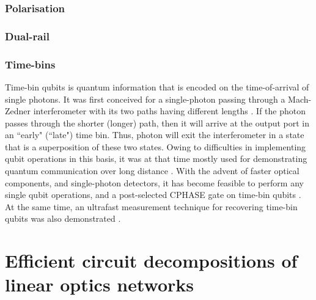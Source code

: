 \documentclass[aps,rmp,twocolumn,amsmath,amssymb,nofootinbib,superscriptaddress]{revtex4}
\begin{document}
\subsubsection{Polarisation}

\subsubsection{Dual-rail}

\subsubsection{Time-bins}
Time-bin qubits is quantum information that is encoded on the time-of-arrival of single photons. It was first conceived for a single-photon passing through a Mach-Zedner interferometer with its two paths having different lengths \cite{bib:Brendel99}. If the photon passes through the shorter (longer) path, then it will arrive at the output port in an ``early" (``late") time bin. Thus, photon will exit the interferometer in a state that is a superposition of these two states. Owing to difficulties in implementing qubit operations in this basis, it was at that time mostly used for demonstrating quantum communication over long distance \cite{bib:Thew02,bib:Marcikic04}. With the advent of faster optical components, and single-photon detectors, it has become feasible to perform any single qubit operations, and a post-selected CPHASE gate on time-bin qubits \cite{bib:Humphreys2013}. At the same time, an ultrafast measurement technique for recovering time-bin qubits was also demonstrated \cite{bib:Donohue2013}.





\section{Efficient circuit decompositions of linear optics networks}
\end{document}

